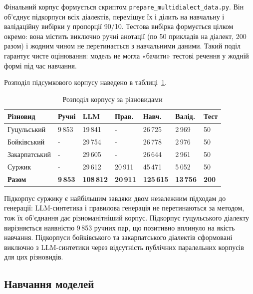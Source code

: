 \documentclass[14pt]{extarticle}
\begin{document}
Фінальний корпус формується скриптом \texttt{prepare\_multidialect\_data.py}. Він об'єднує підкорпуси всіх діалектів, перемішує їх і ділить на навчальну і валідаційну вибірки у пропорції 90/10. Тестова вибірка формується цілком окремо: вона містить виключно ручні анотації (по 50 прикладів на діалект, 200 разом) і жодним чином не перетинається з навчальними даними. Такий поділ гарантує чисте оцінювання: модель не могла «бачити» тестові речення у жодній формі під час навчання.

Розподіл підсумкового корпусу наведено в таблиці~\ref{tab:corpus_dist}.

\captionsetup[table]{justification=raggedleft}
\begin{table}[h]
\caption{Розподіл корпусу за різновидами}
\label{tab:corpus_dist}
\setlength{\tabcolsep}{4pt}
\begin{tabular}{|p{}|p{}|p{}|p{}|p{}|p{}|p{}|}
\hline
\textbf{Різновид} & \textbf{Ручні} & \textbf{LLM} & \textbf{Прав.} & \textbf{Навч.} & \textbf{Валід.} & \textbf{Тест} \\
\hline
Гуцульський & 9\,853 & 19\,841 & - & 26\,725 & 2\,969 & 50 \\
\hline
Бойківський & - & 29\,754 & - & 26\,778 & 2\,976 & 50 \\
\hline
Закарпатський & - & 29\,605 & - & 26\,644 & 2\,961 & 50 \\
\hline
Суржик & - & 29\,612 & 20\,911 & 45\,471 & 5\,052 & 50 \\
\hline
\textbf{Разом} & \textbf{9\,853} & \textbf{108\,812} & \textbf{20\,911} & \textbf{125\,615} & \textbf{13\,756} & \textbf{200} \\
\hline
\end{tabular}
\end{table}

Підкорпус суржику є найбільшим завдяки двом незалежним підходам до генерації: LLM-синтетика і правилова генерація не перетинаються за методом, тож їх об'єднання дає різноманітніший корпус. Підкорпус гуцульського діалекту вирізняється наявністю 9\,853 ручних пар, що позитивно вплинуло на якість навчання. Підкорпуси бойківського та закарпатського діалектів сформовані виключно з LLM-синтетики через відсутність публічних паралельних корпусів для цих різновидів.

\subsection{Навчання моделей}
\end{document}
